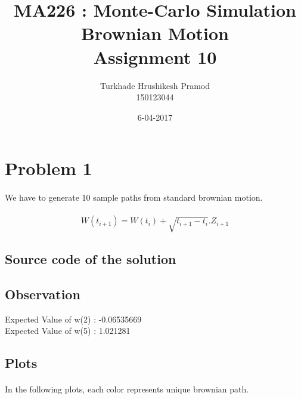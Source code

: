 \documentclass{article}
\title{%
	MA226 : Monte-Carlo Simulation\\
	 Brownian Motion\\
	 \large Assignment 10}
\date{6-04-2017}
\author{%
	Turkhade Hrushikesh Pramod\\
	150123044	}
\begin{document}
	\maketitle
	
	\newpage
	
	\section{Problem 1}
	\paragraph{}
		We have to generate 10 sample paths from standard brownian motion.
	\paragraph{}
	\[W(t_{i+1}) = W(t_i)+\sqrt{t_{i+1}-t_i}.Z_{i+1}\]
		
	\subsection{Source code of the solution}
		
		
	\subsection{Observation}

	
Expected Value of w(2) :  -0.06535669 \\
Expected Value of w(5) :  1.021281\\

	\clearpage

		\subsection{Plots}
	
		\paragraph{}
		In the following plots, each color represents unique brownian path.		
		
\end{document}

